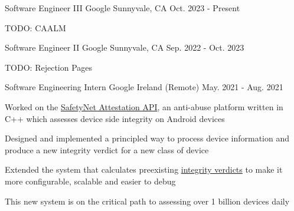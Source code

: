 
\hypersetup{
    colorlinks=true,
    linkcolor=blue,
    filecolor=magenta,
    urlcolor=awesome,
}



\begin{cventries}

  \cventry
    {Software Engineer III}
    {Google}
    {Sunnyvale, CA}
    {Oct. 2023 - Present}
    {
      \begin{cvitems}
        \item TODO: CAALM
      \end{cvitems}
    }

  \cventry
    {Software Engineer II}
    {Google}
    {Sunnyvale, CA}
    {Sep. 2022 - Oct. 2023}
    {
      \begin{cvitems}
        \item TODO: Rejection Pages
      \end{cvitems}
    }

  \cventry
    {Software Engineering Intern}
    {Google}
    {Ireland (Remote)}
    {May. 2021 - Aug. 2021}
    {
      \begin{cvitems}
      \item Worked on the \href{https://developer.android.com/training/safetynet/attestation}{SafetyNet Attestation API}, an anti-abuse platform written in C++ which assesses device side integrity on Android devices
        \item Designed and implemented a principled way to process device information and produce a new integrity verdict for a new class of device
        \item Extended the system that calculates preexisting \href{https://developer.android.com/training/safetynet/attestation\#potential-integrity-verdicts}{integrity verdicts} to make it more configurable, scalable and easier to debug
        \item This new system is on the critical path to assessing over 1 billion devices daily
      \end{cvitems}
    }


\end{cventries}
